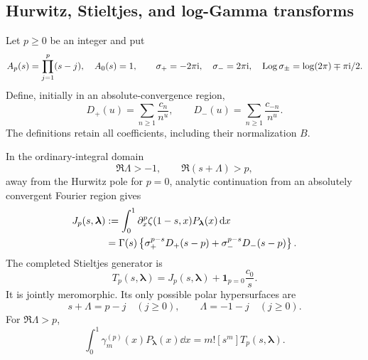 \subsection{Hurwitz, Stieltjes, and log-Gamma transforms}

Let $p\ge0$ be an integer and put
\[
 A_p(s)=\prod_{j=1}^p(s-j),\quad A_0(s)=1,\qquad
 \sigma_+=-2\pi\mathrm i,\quad \sigma_-=2\pi\mathrm i,
 \quad \operatorname{Log}\sigma_\pm=\log(2\pi)\mp\pi\mathrm i/2.
\]
Define, initially in an absolute-convergence region,
\begin{equation}\label{mr:Dirichlet}
 D_+(u)=\sum_{n\ge1}\frac{c_n}{n^u},\qquad
 D_-(u)=\sum_{n\ge1}\frac{c_{-n}}{n^u}.
\end{equation}
The definitions retain all coefficients, including their normalization $B$.

\begin{theorem}
\label{mr:hurwitz}
In the ordinary-integral domain
\[
 \Re\Lambda>-1,\qquad \Re(s+\Lambda)>p,
\]
away from the Hurwitz pole for $p=0$, analytic continuation from an
absolutely convergent Fourier region gives
\begin{align}
 J_p(s,\boldsymbol\lambda)
 &:=\int_0^1\partial_x^p\zeta(1-s,x)P_{\boldsymbol\lambda}(x)\,\mathrm d x\notag\\
 &=\Gamma(s)\left\{\sigma_+^{p-s}D_+(s-p)
                      +\sigma_-^{p-s}D_-(s-p)\right\}.
       \label{mr:Hurwitz}
\end{align}
The completed Stieltjes generator is
\begin{equation}\label{mr:T}
 T_p(s,\boldsymbol\lambda)=J_p(s,\boldsymbol\lambda)
                                  +\mathbf1_{p=0}\frac{c_0}{s}.
\end{equation}
It is jointly meromorphic. Its only possible polar hypersurfaces are
\begin{equation}\label{mr:poles}
       s+\Lambda=p-j\quad(j\ge0),\qquad
       \Lambda=-1-j\quad(j\ge0).
\end{equation}
For $\Re\Lambda>p$,
\begin{equation}\label{mr:ordinaryStieltjes}
 \int_0^1\gamma_m^{(p)}(x)P_{\boldsymbol\lambda}(x)\dd x
                  =m![s^m]T_p(s,\boldsymbol\lambda).
\end{equation}
\end{theorem}

